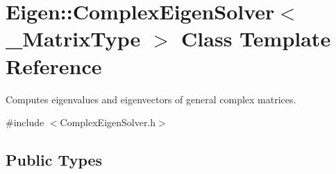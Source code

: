 \hypertarget{class_eigen_1_1_complex_eigen_solver}{}\section{Eigen\+::Complex\+Eigen\+Solver$<$ \+\_\+\+Matrix\+Type $>$ Class Template Reference}
\label{class_eigen_1_1_complex_eigen_solver}


Computes eigenvalues and eigenvectors of general complex matrices.  




{\ttfamily \#include $<$Complex\+Eigen\+Solver.\+h$>$}

\subsection*{Public Types}
